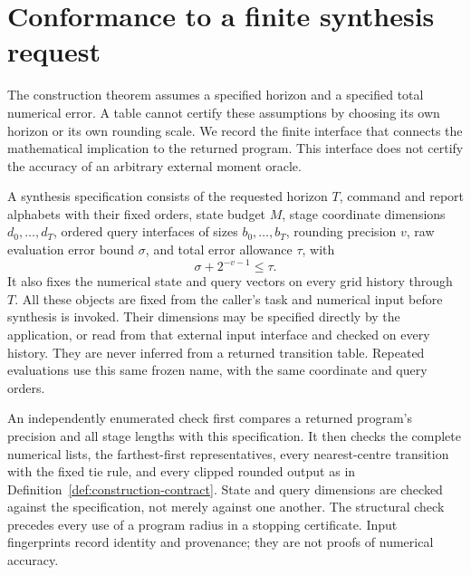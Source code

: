 \section{Conformance to a finite synthesis request}
\label{sec:request-conformance}
The construction theorem assumes a specified horizon and a specified
total numerical error. A table cannot certify these assumptions by
choosing its own horizon or its own rounding scale. We record the finite
interface that connects the mathematical implication to the returned
program. This interface does not certify the accuracy of an arbitrary
external moment oracle.

\begin{definition}
\label{def:bound-request}
A synthesis specification consists of the requested horizon $T$, command
and report alphabets with their fixed orders, state budget $M$, stage
coordinate dimensions $d_0,\ldots,d_T$, ordered query interfaces of
sizes $b_0,\ldots,b_T$, rounding precision $v$, raw evaluation error
bound $\sigma$, and total error allowance $\tau$, with
\begin{equation}\label{eq:bound-rounding-budget}
 \sigma+2^{-v-1}\le\tau.
\end{equation}
It also fixes the numerical state and query vectors on every grid history
through $T$. All these objects are fixed from the caller's task and
numerical input before synthesis is invoked. Their dimensions may be
specified directly by the application, or read from that external input
interface and checked on every history. They are never inferred from a
returned transition table. Repeated evaluations use this same frozen
name, with the same coordinate and query orders.
\end{definition}

An independently enumerated check first compares a returned program's
precision and all stage lengths with this specification. It then checks
the complete numerical lists, the farthest-first representatives, every
nearest-centre transition with the fixed tie rule, and every clipped
rounded output as in Definition~\ref{def:construction-contract}.
State and query dimensions are checked against the specification, not
merely against one another. The structural check precedes every use of
a program radius in a stopping certificate. Input fingerprints record
identity and provenance; they are not proofs of numerical accuracy.

